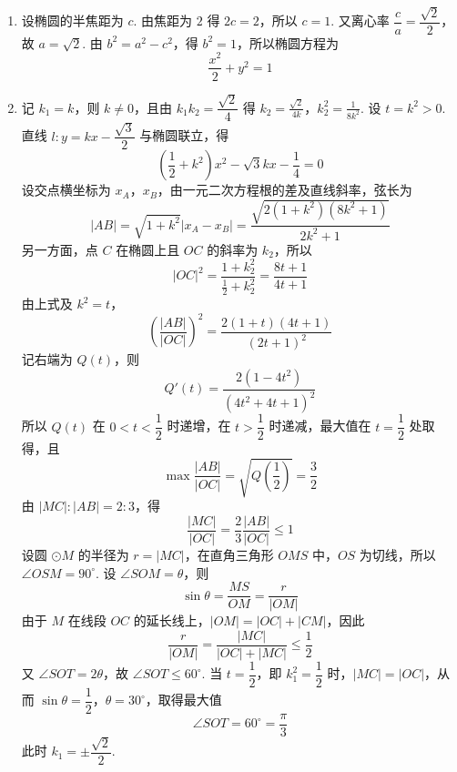 \begin{solution}
\begin{enumerate}
\item 设椭圆的半焦距为 \(c\). 由焦距为 \(2\) 得 \(2c=2\)，所以 \(c=1\). 又离心率 \(\dfrac ca=\dfrac{\sqrt2}{2}\)，故 \(a=\sqrt2\). 由 \(b^2=a^2-c^2\)，得 \(b^2=1\)，所以椭圆方程为
\[
\frac{x^2}{2}+y^2=1
\]
\item 记 \(k_1=k\)，则 \(k\ne0\)，且由 \(k_1k_2=\dfrac{\sqrt2}{4}\) 得
\(k_2=\frac{\sqrt2}{4k}\)，\(k_2^2=\frac1{8k^2}\).
设 \(t=k^2>0\). 直线 \(l:y=kx-\dfrac{\sqrt3}{2}\) 与椭圆联立，得
\[
\left(\frac12+k^2\right)x^2-\sqrt3kx-\frac14=0
\]
设交点横坐标为 \(x_A\)，\(x_B\)，由一元二次方程根的差及直线斜率，弦长为
\[
|AB|=\sqrt{1+k^2}|x_A-x_B|
=\frac{\sqrt{2(1+k^2)(8k^2+1)}}{2k^2+1}
\]
另一方面，点 \(C\) 在椭圆上且 \(OC\) 的斜率为 \(k_2\)，所以
\[
|OC|^2=\frac{1+k_2^2}{\frac12+k_2^2}=\frac{8t+1}{4t+1}
\]
由上式及 \(k^2=t\)，
\[
\left(\frac{|AB|}{|OC|}\right)^2
=\frac{2(1+t)(4t+1)}{(2t+1)^2}
\]
记右端为 \(Q(t)\)，则
\[
Q'(t)=\frac{2(1-4t^2)}{(4t^2+4t+1)^2}
\]
所以 \(Q(t)\) 在 \(0<t<\dfrac12\) 时递增，在 \(t>\dfrac12\) 时递减，最大值在 \(t=\dfrac12\) 处取得，且
\[
\max\frac{|AB|}{|OC|}=\sqrt{Q\left(\frac12\right)}=\frac32
\]
由 \(|MC|:|AB|=2:3\)，得
\[
\frac{|MC|}{|OC|}=\frac23\frac{|AB|}{|OC|}\leq1
\]
设圆 \(\odot M\) 的半径为 \(r=|MC|\)，在直角三角形 \(OMS\) 中，\(OS\) 为切线，所以 \(\angle OSM=90^\circ\). 设 \(\angle SOM=\theta\)，则
\[
\sin\theta=\frac{MS}{OM}=\frac r{|OM|}
\]
由于 \(M\) 在线段 \(OC\) 的延长线上，\(|OM|=|OC|+|CM|\)，因此
\[
\frac r{|OM|}=\frac{|MC|}{|OC|+|MC|}\leq\frac12
\]
又 \(\angle SOT=2\theta\)，故 \(\angle SOT\leq60^\circ\). 当 \(t=\dfrac12\)，即 \(k_1^2=\dfrac12\) 时，\(|MC|=|OC|\)，从而 \(\sin\theta=\dfrac12\)，\(\theta=30^\circ\)，取得最大值
\[
\angle SOT=60^\circ=\frac\pi3
\]
此时 \(k_1=\pm\dfrac{\sqrt2}{2}\).
\end{enumerate}
\end{solution}
